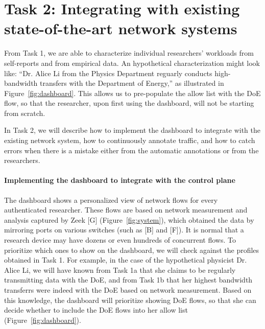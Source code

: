 \section{Task 2: Integrating with existing state-of-the-art network systems}

From Task 1, we are able to characterize individual researchers' workloads from self-reports and from empirical data. An hypothetical characterization might look like: ``Dr. Alice Li from the Physics Department reguarly conducts high-bandwidth transfers with the Department of Energy,'' as illustrated in Figure~\ref{fig:dashboard}. This allows us to pre-populate the allow list with the DoE flow, so that the researcher, upon first using the dashboard, will not be starting from scratch.

In Task 2, we will describe how to implement the dashboard to integrate with the existing network system, how to continuously annotate traffic, and how to catch errors when there is a mistake either from the automatic annotations or from the researchers.


\paragraph{Implementing the dashboard to integrate with the control plane}
The dashboard shows a personalized view of network flows for every authenticated researcher. These flows are based on network measurement and analysis captured by Zeek [G] (Figure~\ref{fig:system}), which obtained the data by mirroring ports on various switches (such as [B] and [F]). It is normal that a research device may have dozens or even hundreds of concurrent flows. To prioritize which ones to show on the dashboard, we will check against the profiles obtained in Task 1. For example, in the case of the hypothetical physicist Dr. Alice Li, we will have known from Task 1a that she claims to be regularly transmitting data with the DoE, and from Task 1b that her highest bandwidth transferrs were indeed with the DoE based on network measurement. Based on this knowledge, the dashboard will prioritize showing DoE flows, so that she can decide whether to include the DoE flows into her allow list (Figure~\ref{fig:dashboard}).

